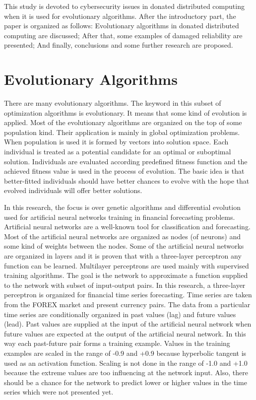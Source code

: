\documentclass[graybox]{svmult}
\begin{document}
This study is devoted to cybersecurity issues in donated distributed computing when it is used for evolutionary algorithms. After the introductory part, the paper is organized as follows: Evolutionary algorithms in donated distributed computing are discussed; After that, some examples of damaged reliability are presented; And finally, conclusions and some further research are proposed. 

\section{Evolutionary Algorithms}
\label{sec:02}

There are many evolutionary algorithms. The keyword in this subset of optimization algorithms is evolutionary. It means that some kind of evolution is applied. Most of the evolutionary algorithms are organized on the top of some population kind. Their application is mainly in global optimization problems. When population is used it is formed by vectors into solution space. Each individual is treated as a potential candidate for an optimal or suboptimal solution. Individuals are evaluated according predefined fitness function and the achieved fitness value is used in the process of evolution. The basic idea is that better-fitted individuals should have better chances to evolve with the hope that evolved individuals will offer better solutions. 

In this research, the focus is over genetic algorithms and differential evolution used for artificial neural networks training in financial forecasting problems. Artificial neural networks are a well-known tool for classification and forecasting. Most of the artificial neural networks are organized as nodes (of neurons) and some kind of weights between the nodes. Some of the artificial neural networks are organized in layers and it is proven that with a three-layer perceptron any function can be learned. Multilayer perceptrons are used mainly with supervised training algorithms. The goal is the network to approximate a function supplied to the network with subset of input-output pairs. In this research, a three-layer perceptron is organized for financial time series forecasting. Time series are taken from the FOREX market and present currency pairs. The data from a particular time series are conditionally organized in past values (lag) and future values (lead). Past values are supplied at the input of the artificial neural network when future values are expected at the output of the artificial neural network. In this way each past-future pair forms a training example. Values in the training examples are scaled in the range of -0.9 and +0.9 because hyperbolic tangent is used as an activation function. Scaling is not done in the range of -1.0 and +1.0 because the extreme values are too influencing at the network input. Also, there should be a chance for the network to predict lower or higher values in the time series which were not presented yet. 
\end{document}
